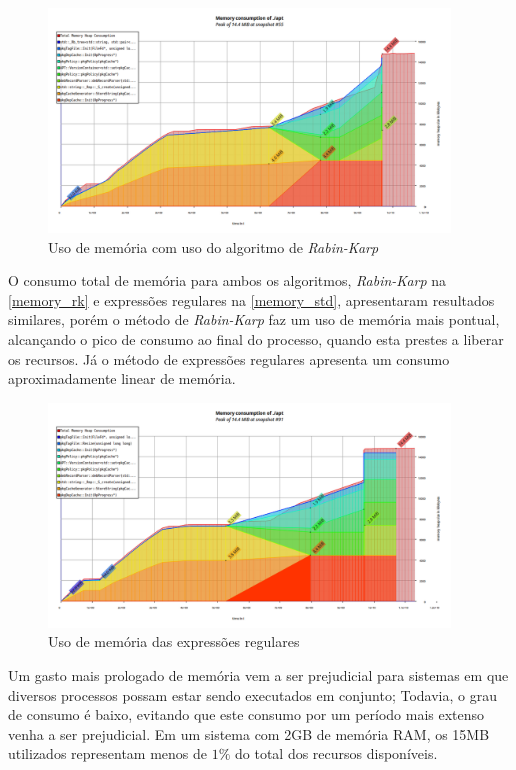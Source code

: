 \begin{figure}[htbp]
  \centering
  \includegraphics[width=0.95\textwidth]{figuras/memory_rk.png}
  \caption{Uso de memória com uso do algoritmo de \textit{Rabin-Karp}}
  \label{memory_rk}
\end{figure}

O consumo total de memória para ambos os algoritmos, \textit{Rabin-Karp} na \autoref{memory_rk} e expressões regulares na \autoref{memory_std},  apresentaram resultados similares, porém o método de \textit{Rabin-Karp} faz um uso de memória mais pontual, alcançando o pico de consumo ao final do processo, quando esta prestes a liberar os recursos. Já o método de expressões regulares apresenta um consumo aproximadamente linear de memória. 


\begin{figure}[htbp]
  \centering
  \includegraphics[width=0.95\textwidth]{figuras/memory_regex.png}
  \caption{Uso de memória das expressões regulares}
  \label{memory_std}
\end{figure}

Um gasto mais prologado de memória vem a ser prejudicial para sistemas em que diversos processos possam estar sendo executados em conjunto; Todavia, o grau de consumo é baixo, evitando que este consumo por um período mais extenso venha a ser prejudicial. Em um sistema com 2GB de memória RAM, os 15MB utilizados representam menos de $1\%$ do total dos recursos disponíveis.

